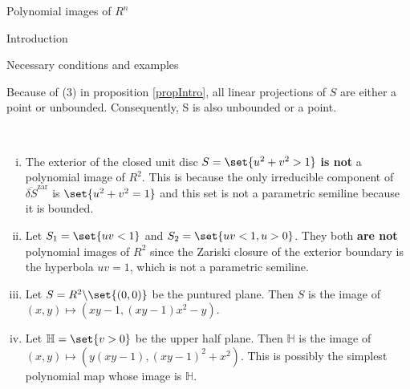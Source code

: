 \documentclass[11pt, a4paper, english, twoside, notitlepage]{report}
\begin{document}
\begin{chapter}{Polynomial images of $R^n$}
\begin{section}{Introduction}
\begin{subsection}{Necessary conditions and examples}
	\begin{corolary}
		Because of (3) in proposition \ref{propIntro}, all linear projections of $S$ are either a point or unbounded. Consequently, S is also unbounded or a point.
	\end{corolary}
	
	\begin{example}
		\
		\begin{enumerate}[(i)]
			
			\item The exterior of the closed unit disc $S = \set{u^2 + v^2 > 1}$ \textbf{is not} a polynomial image of $R^2$. This is because the only irreducible component of $\overline{\delta S}^{\text{zar}}$ is $\set{u^2 + v^2 = 1}$ and this set is not a parametric semiline because it is bounded.
			
			\item Let $S_1 = \set{uv < 1}$ and $S_2 = \set{uv < 1, u > 0}$. %
			They both \textbf{are not} polynomial images of $R^2$ since the Zariski closure of the exterior boundary is the hyperbola $uv = 1$, which is not a parametric semiline.
			
			\item Let $S = R^2 \backslash \set{(0, 0)}$ be the puntured plane. Then $S$ is the image of $(x, y) \mapsto (xy - 1, (xy - 1)x^2 - y)$.
			
			\item Let $\mathbb{H} = \set{v > 0}$ be the upper half plane. Then $\mathbb{H}$ is the image of $(x, y) \mapsto (y(xy - 1), (xy - 1)^2 + x^2)$. This is possibly the simplest polynomial map whose image is $\mathbb{H}$.
			
		\end{enumerate}
		
	\end{example}
	
	
	\end{subsection}
	
\end{section}

\end{chapter}
\end{document}
